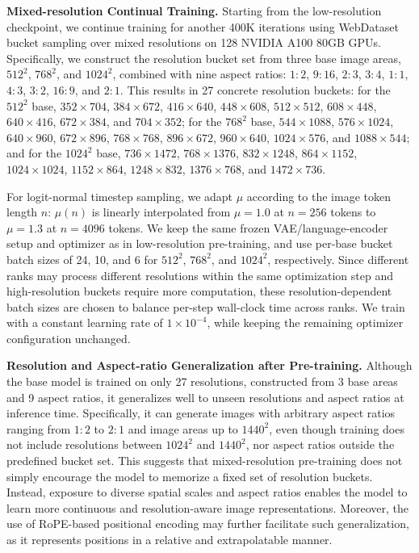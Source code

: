 \noindent\textbf{Mixed-resolution Continual Training.} Starting from the low-resolution checkpoint, we continue training for another 400K iterations using WebDataset bucket sampling over mixed resolutions on 128 NVIDIA A100 80GB GPUs. Specifically, we construct the resolution bucket set from three base image areas, $512^2$, $768^2$, and $1024^2$, combined with nine aspect ratios: $1{:}2$, $9{:}16$, $2{:}3$, $3{:}4$, $1{:}1$, $4{:}3$, $3{:}2$, $16{:}9$, and $2{:}1$. This results in 27 concrete resolution buckets: for the $512^2$ base, $352\times704$, $384\times672$, $416\times640$, $448\times608$, $512\times512$, $608\times448$, $640\times416$, $672\times384$, and $704\times352$; for the $768^2$ base, $544\times1088$, $576\times1024$, $640\times960$, $672\times896$, $768\times768$, $896\times672$, $960\times640$, $1024\times576$, and $1088\times544$; and for the $1024^2$ base, $736\times1472$, $768\times1376$, $832\times1248$, $864\times1152$, $1024\times1024$, $1152\times864$, $1248\times832$, $1376\times768$, and $1472\times736$.

For logit-normal timestep sampling, we adapt $\mu$ according to the image token length $n$: $\mu(n)$ is linearly interpolated from $\mu{=}1.0$ at $n{=}256$ tokens to $\mu{=}1.3$ at $n{=}4096$ tokens. We keep the same frozen VAE/language-encoder setup and optimizer as in low-resolution pre-training, and use per-base bucket batch sizes of 24, 10, and 6 for $512^2$, $768^2$, and $1024^2$, respectively. Since different ranks may process different resolutions within the same optimization step and high-resolution buckets require more computation, these resolution-dependent batch sizes are chosen to balance per-step wall-clock time across ranks. We train with a constant learning rate of $1\times10^{-4}$, while keeping the remaining optimizer configuration unchanged.



\noindent\textbf{Resolution and Aspect-ratio Generalization after Pre-training.}
Although the base model is trained on only 27 resolutions, constructed from 3 base areas and 9 aspect ratios, it generalizes well to unseen resolutions and aspect ratios at inference time. Specifically, it can generate images with arbitrary aspect ratios ranging from $1{:}2$ to $2{:}1$ and image areas up to $1440^2$, even though training does not include resolutions between $1024^2$ and $1440^2$, nor aspect ratios outside the predefined bucket set. This suggests that mixed-resolution pre-training does not simply encourage the model to memorize a fixed set of resolution buckets. Instead, exposure to diverse spatial scales and aspect ratios enables the model to learn more continuous and resolution-aware image representations. Moreover, the use of RoPE-based positional encoding may further facilitate such generalization, as it represents positions in a relative and extrapolatable manner.


